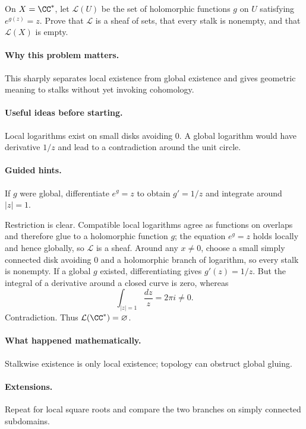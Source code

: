 \begin{problem}
On $X=\CC^*$, let $\mathcal L(U)$ be the set of holomorphic functions $g$ on $U$ satisfying $e^{g(z)}=z$. Prove that $\mathcal L$ is a sheaf of sets, that every stalk is nonempty, and that $\mathcal L(X)$ is empty.
\end{problem}

\paragraph{Why this problem matters.}
This sharply separates local existence from global existence and gives geometric meaning to stalks without yet invoking cohomology.

\paragraph{Useful ideas before starting.}
Local logarithms exist on small disks avoiding $0$. A global logarithm would have derivative $1/z$ and lead to a contradiction around the unit circle.

\paragraph{Guided hints.}
If $g$ were global, differentiate $e^g=z$ to obtain $g' = 1/z$ and integrate around $|z|=1$.

\ifdefined\FullProblemDossiers
\begin{solution}
Restriction is clear. Compatible local logarithms agree as functions on overlaps and therefore glue to a holomorphic function $g$; the equation $e^g=z$ holds locally and hence globally, so $\mathcal L$ is a sheaf. Around any $x\neq0$, choose a small simply connected disk avoiding $0$ and a holomorphic branch of logarithm, so every stalk is nonempty. If a global $g$ existed, differentiating gives $g'(z)=1/z$. But the integral of a derivative around a closed curve is zero, whereas
\[
\int_{|z|=1}\frac{dz}{z}=2\pi i\neq0.
\]
Contradiction. Thus $\mathcal L(\CC^*)=\varnothing$.
\end{solution}

\paragraph{What happened mathematically.}
Stalkwise existence is only local existence; topology can obstruct global gluing.

\paragraph{Extensions.}
Repeat for local square roots and compare the two branches on simply connected subdomains.
\fi
